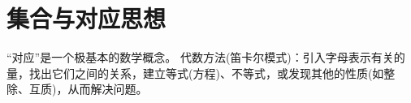   \Teach{}
  \newtheorem*{Theorem}{定理}
  \makefront
\vspace{-1.5em}
\startexercise
\section{集合与对应思想}
  “对应”是一个极基本的数学概念。
  代数方法(笛卡尔模式)：引入字母表示有关的量，找出它们之间的关系，建立等式(方程)、不等式，或发现其他的性质(如整除、互质)，从而解决问题。
